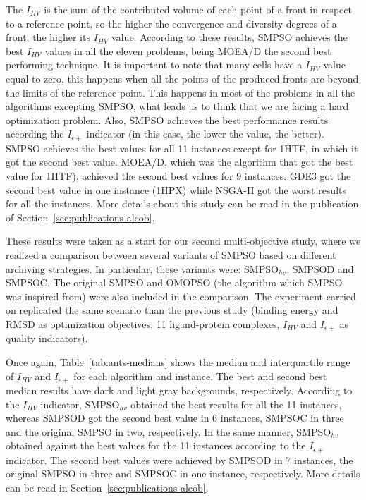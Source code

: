The $I_{HV}$ is the sum of the contributed volume of each point of a front in respect to a reference point, so the higher the convergence and diversity degrees of a front, the higher its $I_{HV}$ value. According to these results, SMPSO achieves the best $I_{HV}$ values in all the eleven problems, being MOEA/D the second best performing technique. It is important to note that many cells have a $I_{HV}$ value equal to zero, this happens when all the points of the produced fronts are beyond the limits of the reference point. This happens in most of the problems in all the algorithms excepting SMPSO, what leads us to think that we are facing a hard optimization problem.
Also, SMPSO achieves the best performance results according the $I_{\epsilon+}$ indicator (in this case, the lower the value, the better). SMPSO achieves the best values for all 11 instances except for 1HTF, in which it got the second best value. MOEA/D, which was the algorithm that got the best value for 1HTF), achieved the second best values for 9 instances. GDE3 got the second best value in one instance (1HPX) while NSGA-II got the worst results for all the instances. More details about this study can be read in the publication of Section~\ref{sec:publications-alcob}.

These results were taken as a start for our second multi-objective study, where we realized a comparison between several variants of SMPSO based on different archiving strategies. In particular, these variants were: SMPSO$_{hv}$, SMPSOD and  SMPSOC. The original SMPSO and OMOPSO (the algorithm which SMPSO was inspired from) were also included in the comparison. The experiment carried on replicated the same scenario than the previous study (binding energy and RMSD as optimization objectives, 11 ligand-protein complexes, $I_{HV}$ and $I_{\epsilon+}$ as quality indicators).

Once again, Table~\ref{tab:ants-medians} shows the median and interquartile range of $I_{HV}$ and $I_{\epsilon+}$ for each algorithm and instance. The best and second best median results have dark and light gray backgrounds, respectively. According to the $I_{HV}$ indicator, SMPSO$_{hv}$ obtained the best results for all the 11 instances, whereas SMPSOD got the second best value in 6 instances, SMPSOC in three and the original SMPSO in two, respectively. In the same manner, SMPSO$_{hv}$ obtained against the best values for the 11 instances according to the $I_{\epsilon+}$ indicator. The second best values were achieved by SMPSOD in 7 instances, the original SMPSO in three and SMPSOC in one instance, respectively. More details can be read in Section~\ref{sec:publications-alcob}.


